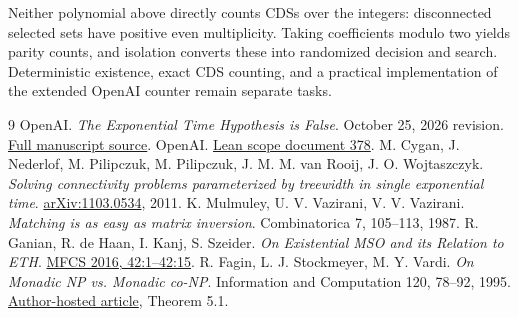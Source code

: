 \documentclass[11pt]{article}
\theoremstyle{remark}\newtheorem{remark}[theorem]{Remark}
\begin{document}
Neither polynomial above directly counts CDSs over the integers:
disconnected selected sets have positive even multiplicity. Taking
coefficients modulo two yields parity counts, and isolation converts
these into randomized decision and search. Deterministic existence,
exact CDS counting, and a practical implementation of the extended
OpenAI counter remain separate tasks.

\begin{thebibliography}{9}
 OpenAI.
\emph{The Exponential Time Hypothesis is False}. October 25, 2026 revision.
\href{https://raw.githubusercontent.com/openai/math/refs/heads/main/preprints/The-Exponential-Time-Hypothesis-is-False-October-25-2026/build/main_full_version.tex}{Full manuscript source}.
 OpenAI.
\href{https://github.com/openai/math/blob/main/lean/docs/378.md}{Lean scope document 378}.
 M. Cygan, J. Nederlof, M. Pilipczuk, M. Pilipczuk,
J. M. M. van Rooij, J. O. Wojtaszczyk.
\emph{Solving connectivity problems parameterized by treewidth in single exponential time}.
\href{https://arxiv.org/abs/1103.0534}{arXiv:1103.0534}, 2011.
 K. Mulmuley, U. V. Vazirani, V. V. Vazirani.
\emph{Matching is as easy as matrix inversion}.
Combinatorica 7, 105--113, 1987.
 R. Ganian, R. de Haan, I. Kanj, S. Szeider.
\emph{On Existential MSO and its Relation to ETH}.
\href{https://drops.dagstuhl.de/entities/document/10.4230/LIPIcs.MFCS.2016.42}{MFCS 2016, 42:1--42:15}.
 R. Fagin, L. J. Stockmeyer, M. Y. Vardi.
\emph{On Monadic NP vs. Monadic co-NP}.
Information and Computation 120, 78--92, 1995.
\href{https://s3.us.cloud-object-storage.appdomain.cloud/res-files/500-infcom95.pdf}{Author-hosted article}, Theorem 5.1.
\end{thebibliography}
\end{document}
